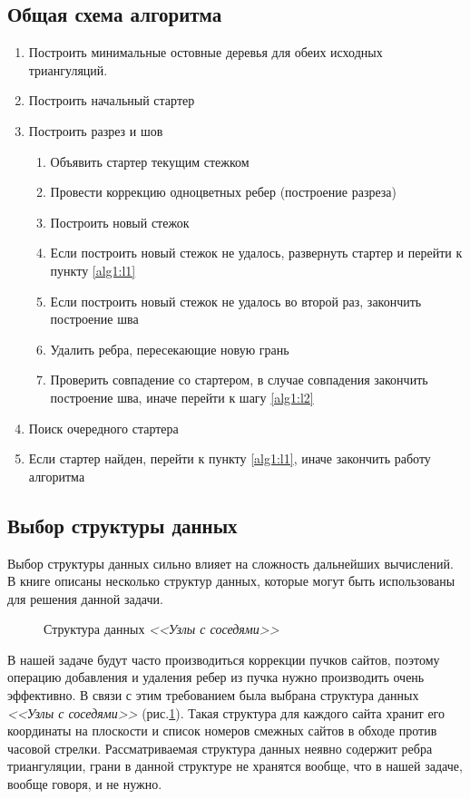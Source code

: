 \documentclass[12pt]{article}
\begin{document}
\subsection{Общая схема алгоритма}
\begin{enumerate}
	\item Построить минимальные остовные деревья для обеих исходных триангуляций.
	\item Построить начальный стартер
	\item \label{alg1:l1} Построить разрез и шов
	\begin{enumerate}
		\item Объявить стартер текущим стежком
		\item Провести коррекцию одноцветных ребер (построение разреза)
		\item \label{alg1:l2} Построить новый стежок
		\item Если построить новый стежок не удалось, развернуть стартер и перейти к пункту \ref{alg1:l1}
		\item Если построить новый стежок не удалось во второй раз, закончить построение шва
		\item Удалить ребра, пересекающие новую грань
		\item Проверить совпадение со стартером, в случае совпадения закончить построение шва, иначе перейти к шагу \ref{alg1:l2}
	\end{enumerate}
	\item Поиск очередного стартера
	\item Если стартер найден, перейти к пункту \ref{alg1:l1}, иначе закончить работу алгоритма
\end{enumerate}

\subsection{Выбор структуры данных}
Выбор структуры данных сильно влияет на сложность дальнейших вычислений.
В книге \cite[стр. 11-17]{Skvortsov} описаны несколько структур данных, которые могут быть использованы для решения данной задачи.

\begin{figure}[htb!]
	\caption{Структура данных {\itshape <<Узлы с соседями>>}}
	\label{pic:struct}
\end{figure}

В нашей задаче будут часто производиться коррекции пучков сайтов,
поэтому операцию добавления и удаления ребер из пучка нужно производить очень эффективно.
В связи с этим требованием была выбрана структура данных {\itshape <<Узлы с соседями>>} (рис.\ref{pic:struct}).
Такая структура для каждого сайта хранит его координаты на плоскости и список номеров смежных сайтов в обходе против часовой стрелки.
Рассматриваемая структура данных неявно содержит ребра триангуляции, грани в данной структуре не хранятся вообще,
что в нашей задаче, вообще говоря, и не нужно.
\end{document}
